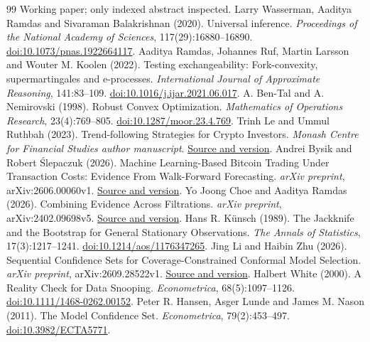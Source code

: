 \begin{thebibliography}{99}
Working paper; only indexed abstract inspected.
Larry Wasserman, Aaditya Ramdas and Sivaraman Balakrishnan (2020). Universal inference. \emph{Proceedings of the National Academy of Sciences}, 117(29):16880--16890.
\href{https://doi.org/10.1073/pnas.1922664117}{doi:10.1073/pnas.1922664117}.
Aaditya Ramdas, Johannes Ruf, Martin Larsson and Wouter M. Koolen (2022). Testing exchangeability: Fork-convexity, supermartingales and e-processes. \emph{International Journal of Approximate Reasoning}, 141:83--109.
\href{https://doi.org/10.1016/j.ijar.2021.06.017}{doi:10.1016/j.ijar.2021.06.017}.
A. Ben-Tal and A. Nemirovski (1998). Robust Convex Optimization. \emph{Mathematics of Operations Research}, 23(4):769--805.
\href{https://doi.org/10.1287/moor.23.4.769}{doi:10.1287/moor.23.4.769}.
Trinh Le and Ummul Ruthbah (2023). Trend-following Strategies for Crypto Investors. \emph{Monash Centre for Financial Studies author manuscript}.
\href{https://www.monash.edu/__data/assets/pdf_file/0011/3744821/Trend-following-Strategies-for-Crypto-Investors.pdf}{Source and version}.
Andrei Bysik and Robert \'{S}lepaczuk (2026). Machine Learning-Based Bitcoin Trading Under Transaction Costs: Evidence From Walk-Forward Forecasting. \emph{arXiv preprint}, arXiv:2606.00060v1.
\href{https://arxiv.org/abs/2606.00060v1}{Source and version}.
Yo Joong Choe and Aaditya Ramdas (2026). Combining Evidence Across Filtrations. \emph{arXiv preprint}, arXiv:2402.09698v5.
\href{https://arxiv.org/abs/2402.09698v5}{Source and version}.
Hans R. K\"{u}nsch (1989). The Jackknife and the Bootstrap for General Stationary Observations. \emph{The Annals of Statistics}, 17(3):1217--1241.
\href{https://doi.org/10.1214/aos/1176347265}{doi:10.1214/aos/1176347265}.
Jing Li and Haibin Zhu (2026). Sequential Confidence Sets for Coverage-Constrained Conformal Model Selection. \emph{arXiv preprint}, arXiv:2609.28522v1.
\href{https://arxiv.org/abs/2609.28522v1}{Source and version}.
Halbert White (2000). A Reality Check for Data Snooping. \emph{Econometrica}, 68(5):1097--1126.
\href{https://onlinelibrary.wiley.com/doi/abs/10.1111/1468-0262.00152}{doi:10.1111/1468-0262.00152}.
Peter R. Hansen, Asger Lunde and James M. Nason (2011). The Model Confidence Set. \emph{Econometrica}, 79(2):453--497.
\href{https://doi.org/10.3982/ECTA5771}{doi:10.3982/ECTA5771}.
\end{thebibliography}
\endgroup
